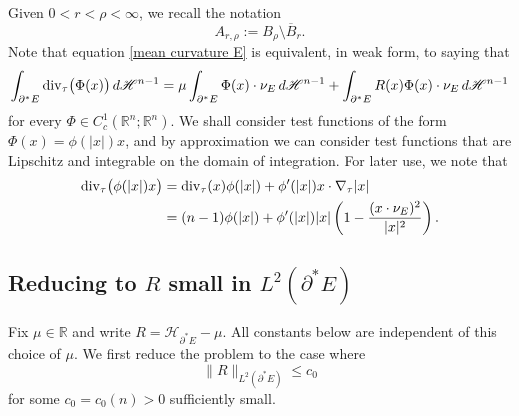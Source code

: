 \documentclass[reqno,11pt]{amsart}
\numberwithin{equation}{section}
\theoremstyle{remark}
\begin{document}
Given $0<r<\rho<\infty$, we recall the notation
$$A_{r,\rho}:=B_{\rho}\setminus \overline{B}_{r}. $$
Note that equation \eqref{mean curvature E} is equivalent, in weak form, to saying that
\begin{equation}\label{eq:mean div}
\int_{\partial^*E} {\rm div}_\tau \big(\Phi(x)\big) \,d\mathscr H^{n-1}=\mu \int_{\partial^*E}  \Phi(x)\cdot \nu_E \,d\mathscr H^{n-1} +  \int_{\partial^*E} R(x)  \Phi(x)\cdot \nu_E \,d\mathscr H^{n-1} 
\end{equation}
for every $\Phi \in C^1_c(\mathbb R^n;\mathbb R^n)$.
We shall consider test functions of the form $\Phi(x)=\phi(|x|)x$, and by approximation we can consider test functions that are Lipschitz and integrable on the domain of integration. For later use, we note that
\begin{equation}\label{eq:div}
\begin{split}
{\rm div}_\tau \big(\phi(|x|)x\big)&= {\rm div}_\tau(x) \phi(|x|) + \phi'(|x|) x\cdot \nabla_\tau |x|\\
&=(n-1)\phi(|x|)+ \phi'(|x|)|x|\left(1-\frac{(x\cdot \nu_E)^2}{|x|^2}\right).
\end{split}
\end{equation}


\subsection{Reducing to $R$ small in $L^2(\partial^* E)$}
Fix $\mu\in\mathbb R$ and write $R=\mathcal H_{\partial^*E}-\mu$.
All constants below are independent of this choice of $\mu$.
We first reduce the problem to the case where
\begin{equation}\label{R small}
    \|R\|_{L^2(\partial^*E)} \leq c_0
\end{equation} 
for some $c_0=c_0(n)>0$ sufficiently small. 
\end{document}
